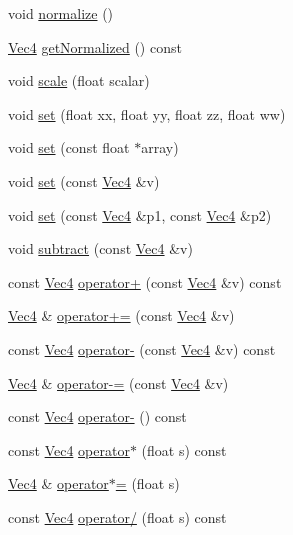 \begin{DoxyCompactItemize}
\item 
void \hyperlink{classVec4_aecf9d5a3003c2a443098b4d80bc9dea6}{normalize} ()
\item 
\hyperlink{classVec4}{Vec4} \hyperlink{classVec4_aa5a3512165c25bf7d5d64293db3fbd64}{get\+Normalized} () const
\item 
void \hyperlink{classVec4_af97ed4fd28d88565faef29814467e057}{scale} (float scalar)
\item 
void \hyperlink{classVec4_a65e2bb85e21dc0a4aca4a6f6348b0d48}{set} (float xx, float yy, float zz, float ww)
\item 
void \hyperlink{classVec4_aa3e7f9a7fbb88c0407fc1ec79e2691db}{set} (const float $\ast$array)
\item 
void \hyperlink{classVec4_ab247286076dd5b9d7d88e8b5a73d636a}{set} (const \hyperlink{classVec4}{Vec4} \&v)
\item 
void \hyperlink{classVec4_aaaaf92933c49b13b060f2bdf063fa430}{set} (const \hyperlink{classVec4}{Vec4} \&p1, const \hyperlink{classVec4}{Vec4} \&p2)
\item 
void \hyperlink{classVec4_a8a43b0370837df064167d3dcca9c8952}{subtract} (const \hyperlink{classVec4}{Vec4} \&v)
\item 
const \hyperlink{classVec4}{Vec4} \hyperlink{classVec4_a6e574e817068334beb1ec533bc6cf233}{operator+} (const \hyperlink{classVec4}{Vec4} \&v) const
\item 
\hyperlink{classVec4}{Vec4} \& \hyperlink{classVec4_a95b688b8dddd65d5a775c56755ed050f}{operator+=} (const \hyperlink{classVec4}{Vec4} \&v)
\item 
const \hyperlink{classVec4}{Vec4} \hyperlink{classVec4_a54d8d01faa652f7c3b7204644a01a0d3}{operator-\/} (const \hyperlink{classVec4}{Vec4} \&v) const
\item 
\hyperlink{classVec4}{Vec4} \& \hyperlink{classVec4_a5d61d144300c6f8edcea3292bf15bfde}{operator-\/=} (const \hyperlink{classVec4}{Vec4} \&v)
\item 
const \hyperlink{classVec4}{Vec4} \hyperlink{classVec4_a1638cef5793ee08b5a62bcb8dd06c17c}{operator-\/} () const
\item 
const \hyperlink{classVec4}{Vec4} \hyperlink{classVec4_ad6bcce9a25272c63a5ad3b8cf658c732}{operator$\ast$} (float s) const
\item 
\hyperlink{classVec4}{Vec4} \& \hyperlink{classVec4_a4631d90bca09546d285452d2e7a6f6dc}{operator$\ast$=} (float s)
\item 
const \hyperlink{classVec4}{Vec4} \hyperlink{classVec4_a01bf1811f01aaf89eb1b653188ea1a08}{operator/} (float s) const

\end{DoxyCompactItemize}
